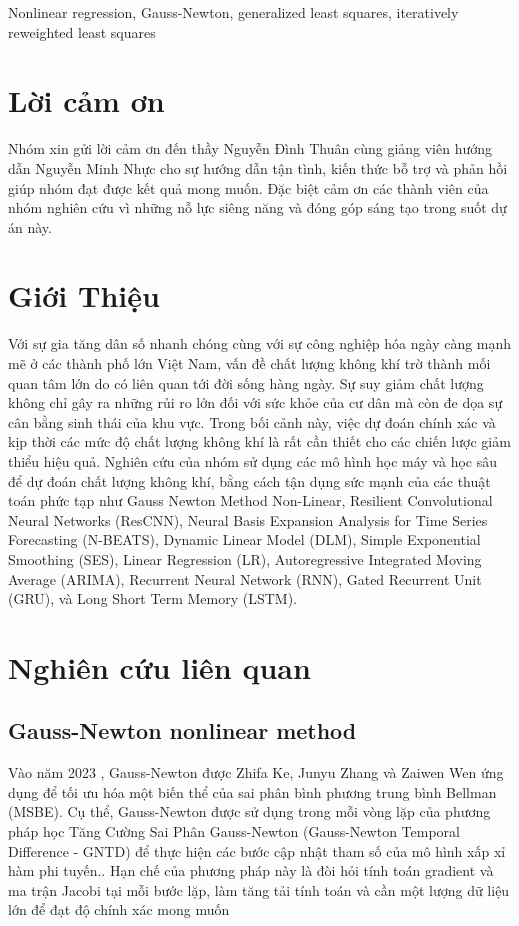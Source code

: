 \documentclass[conference]{IEEEtran}
\begin{document}
\begin{IEEEkeywords}
    Nonlinear regression, Gauss-Newton, generalized least squares, iteratively reweighted least
    squares
\end{IEEEkeywords}

\section*{Lời cảm ơn}
Nhóm xin gửi lời cảm ơn đến thầy Nguyễn Đình Thuân cùng giảng viên hướng dẫn Nguyễn Minh Nhực cho sự hướng dẫn tận tình, kiến thức bỗ trợ và phản hồi giúp nhóm đạt được kết quả mong muốn. Đặc biệt cảm ơn các thành viên của nhóm nghiên cứu vì những nỗ lực siêng năng và đóng góp sáng tạo trong suốt dự án này.


\section{Giới Thiệu}
Với sự gia tăng dân số nhanh chóng cùng với sự công nghiệp hóa ngày càng mạnh mẽ ở các thành phố lớn Việt Nam, vấn đề chất lượng không khí trờ thành mối quan tâm lớn do có liên quan tới đời sống hàng ngày. Sự suy giảm chất lượng không chỉ gây ra những rủi ro lớn đối với sức khỏe của cư dân mà còn đe dọa sự cân bằng sinh thái của khu vực. Trong bối cảnh này, việc dự đoán chính xác và kịp thời các mức độ chất lượng không khí là rất cần thiết cho các chiến lược giảm thiểu hiệu quả. Nghiên cứu của nhóm sử dụng các mô hình học máy và học sâu để dự đoán chất lượng không khí, bằng cách tận dụng sức mạnh của các thuật toán phức tạp như Gauss Newton Method Non-Linear, Resilient Convolutional Neural Networks (ResCNN), Neural Basis Expansion Analysis for Time Series Forecasting (N-BEATS), Dynamic Linear Model (DLM), Simple Exponential Smoothing (SES), Linear Regression (LR), Autoregressive Integrated Moving Average (ARIMA), Recurrent Neural Network (RNN), Gated Recurrent Unit (GRU), và Long Short Term Memory (LSTM).

\section{Nghiên cứu liên quan}

\subsection{Gauss-Newton nonlinear method}

Vào năm 2023 , Gauss-Newton được Zhifa Ke, Junyu Zhang và Zaiwen Wen ứng dụng để tối ưu hóa một biến thể của sai phân bình phương trung bình Bellman (MSBE). Cụ thể, Gauss-Newton được sử dụng trong mỗi vòng lặp của phương pháp học Tăng Cường Sai Phân Gauss-Newton (Gauss-Newton Temporal Difference - GNTD) để thực hiện các bước cập nhật tham số của mô hình xấp xỉ hàm phi tuyến.\cite{gaussnewtonrelated}. Hạn chế của phương pháp này là đòi hỏi tính toán gradient và ma trận Jacobi tại mỗi bước lặp, làm tăng tải tính toán và cần một lượng dữ liệu lớn để đạt độ chính xác mong muốn
\end{document}
